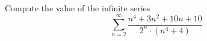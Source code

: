 Compute the value of the infinite series \[\displaystyle\sum_{n=2}^{\infty}\frac{n^4+3n^2+10n+10}{2^n\cdot\left(n^4+4\right)}\]